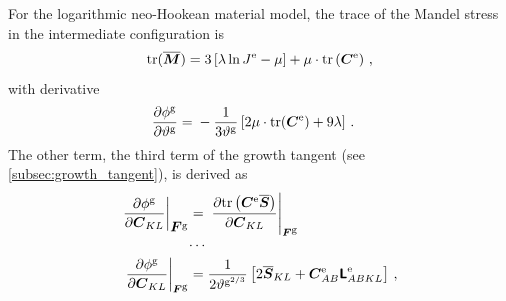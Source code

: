 \documentclass[10pt,letterpaper,oneside]{report}
\newcommand{\ten}[1]{\mbox{\boldmath $#1$}{}}
\newcommand{\tenf}[1]{\mbox{{\sffamily{\bfseries {#1}}}}}
\newcommand{\scas}[1]{\mbox{{\scriptsize{${\rm{#1}}$}}}{}}
\newcommand{\tens}[1]{\mbox{\boldmath{\scriptsize{$#1$}}}{}}
\begin{document}
For the logarithmic neo-Hookean material model, the trace of the Mandel stress in the intermediate configuration is 
\begin{equation}
\text{tr} (\overline{\ten{M}}) = 3 \left[ \lambda \ln J^{\scas{e}} - \mu \right] + \mu \cdot \text{tr} \left( \ten{C}^{\scas{e}} \right) \, , 
\end{equation}
with derivative 
\begin{align}
\frac{\partial \phi^{\scas{g}}}{\partial \vartheta^{\scas{g}}} ={}& - \frac{1}{3 \vartheta^{\scas{g}}} \left[ 2 \mu \cdot \text{tr} (\ten{C}^{\scas{e}}) + 9 \lambda \right] \, .
\end{align}
The other term, the third term of the growth tangent (see \autoref{subsec:growth_tangent}), is derived as
\begin{align}
\left. \frac{ \partial \phi^{\scas{g}} }{ \partial \ten{C}_{KL} } \right|_{\ten{F}^{\scas{g}}}  
={}& \left. \frac{ \partial \text{tr} \left( \ten{C}^{\scas{e}} \overline{\ten{S}} \right) }{ \partial \ten{C}_{KL} } \right|_{\tens{F}^{\scas{g}}} 
\\
\cdots{}& \notag \\
\left. \frac{ \partial \phi^{\scas{g}} }{ \partial \ten{C}_{KL} } \right|_{\tens{F}^{\scas{g}}}  
={}& \frac{1}{2 \vartheta^{\scas{g}^{2/3}}}\left[ 2 \overline{\ten{S}}_{KL} + \ten{C}^{\scas{e}}_{AB} \tenf{L}^{\scas{e}}_{ABKL} \right] \, , 
\end{align}
\end{document}
